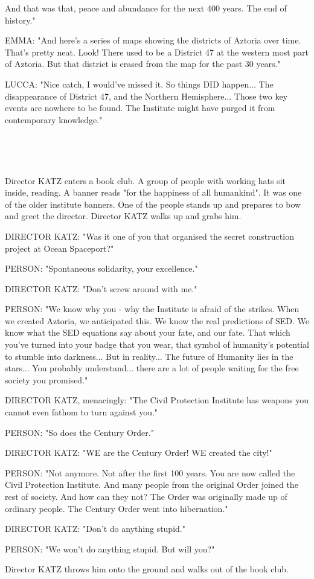 \documentclass[11pt]{article}
\begin{document}
And that was that, peace and abundance for the next 400 years. 
The end of history."

EMMA: "And here's a series of maps showing the districts of Aztoria over time. 
That's pretty neat.
Look! There used to be a District 47 at the western most part of Aztoria.
But that district is erased from the map for the past 30 years."

LUCCA: "Nice catch, I would've missed it. 
So things DID happen...
The disappearance of District 47, and the Northern Hemisphere...
Those two key events are nowhere to be found.
The Institute might have purged it from contemporary knowledge."

\ 

\ 

Director KATZ enters a book club.
A group of people with working hats sit inside, reading.
A banner reads "for the happiness of all humankind". 
It was one of the older institute banners.
One of the people stands up and prepares to bow and greet the director.
Director KATZ walks up and grabs him.

DIRECTOR KATZ: "Was it one of you that organised the secret construction project at Ocean Spaceport?"

PERSON: "Spontaneous solidarity, your excellence."

DIRECTOR KATZ: "Don't screw around with me."

PERSON: "We know why you - why the Institute is afraid of the strikes.
When we created Aztoria, we anticipated this. 
We know the real predictions of SED.
We know what the SED equations say about your fate, and our fate.
That which you've turned into your badge that you wear, that symbol of humanity's potential to stumble into darkness...
But in reality... The future of Humanity lies in the stars...
You probably understand... there are a lot of people waiting for the free society you promised."

DIRECTOR KATZ, menacingly: "The Civil Protection Institute has weapons you cannot even fathom to turn against you."

PERSON: "So does the Century Order."

DIRECTOR KATZ: "WE are the Century Order! 
WE created the city!"

PERSON: "Not anymore. Not after the first 100 years.
You are now called the Civil Protection Institute.
And many people from the original Order joined the rest of society.
And how can they not? 
The Order was originally made up of ordinary people.
The Century Order went into hibernation."

DIRECTOR KATZ: "Don't do anything stupid."

PERSON: "We won't do anything stupid.
But will you?"

Director KATZ throws him onto the ground and walks out of the book club.
\end{document}
